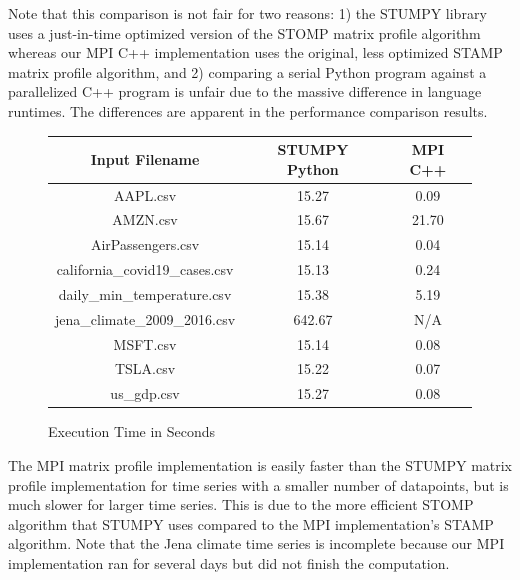 \documentclass[conference]{IEEEtran}
\begin{document}
Note that this comparison is not fair for two reasons:  1) the STUMPY library uses a just-in-time optimized version of the STOMP matrix profile algorithm\cite{Stumpy} whereas our MPI C++ implementation uses the original, less optimized STAMP matrix profile algorithm\cite{MatrixProfile1}, and 2) comparing a serial Python program against a parallelized C++ program is unfair due to the massive difference in language runtimes.  The differences are apparent in the performance comparison results. 

\begin{figure}
\begin{center}
\caption{Execution Time in Seconds}
\begin{tabular}{|c|c|c|}
\hline
\textbf{Input Filename} & \textbf{STUMPY Python} & \textbf{MPI C++} \\ \hline \hline
AAPL.csv & 15.27 & 0.09 \\ \hline
AMZN.csv & 15.67 & 21.70 \\ \hline
AirPassengers.csv & 15.14 & 0.04 \\ \hline
california\_covid19\_cases.csv & 15.13 & 0.24 \\ \hline
daily\_min\_temperature.csv & 15.38 & 5.19 \\ \hline
jena\_climate\_2009\_2016.csv & 642.67 & N/A \\ \hline
MSFT.csv & 15.14 & 0.08 \\ \hline
TSLA.csv & 15.22 & 0.07 \\ \hline
us\_gdp.csv & 15.27 & 0.08 \\ \hline \hline
\end{tabular}
\label{fig:Execution_Time}
\end{center}
\end{figure}

The MPI matrix profile implementation is easily faster than the STUMPY matrix profile implementation for time series with a smaller number of datapoints, but is much slower for larger time series.  This is due to the more efficient STOMP algorithm that STUMPY uses compared to the MPI implementation's STAMP algorithm.  Note that the Jena climate time series is incomplete because our MPI implementation ran for several days but did not finish the computation.
\end{document}
